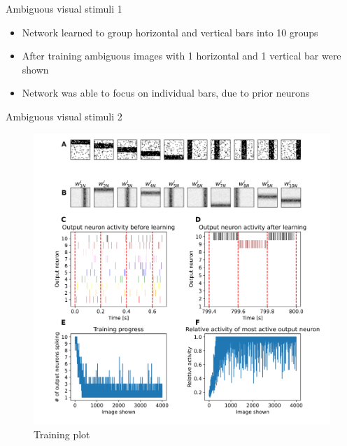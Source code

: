 \documentclass[aspectratio=169]{beamer}
\begin{document}
\begin{frame}{Ambiguous visual stimuli 1}
  \begin{itemize}
    \item Network learned to group horizontal and vertical bars into 10 groups
    \item After training ambiguous images with 1 horizontal and 1 vertical bar were shown
    \item Network was able to focus on individual bars, due to prior neurons
  \end{itemize}
\end{frame}

\begin{frame}{Ambiguous visual stimuli 2}
\vspace{-1.0cm}
        \begin{figure}
        \includegraphics[width=0.40\linewidth]{../Latex/figures/horvertAdaptiveInh/trainingPlotCropped.png}
      \\   \footnotesize Training plot
      \end{figure} 
\end{frame}
\end{document}
